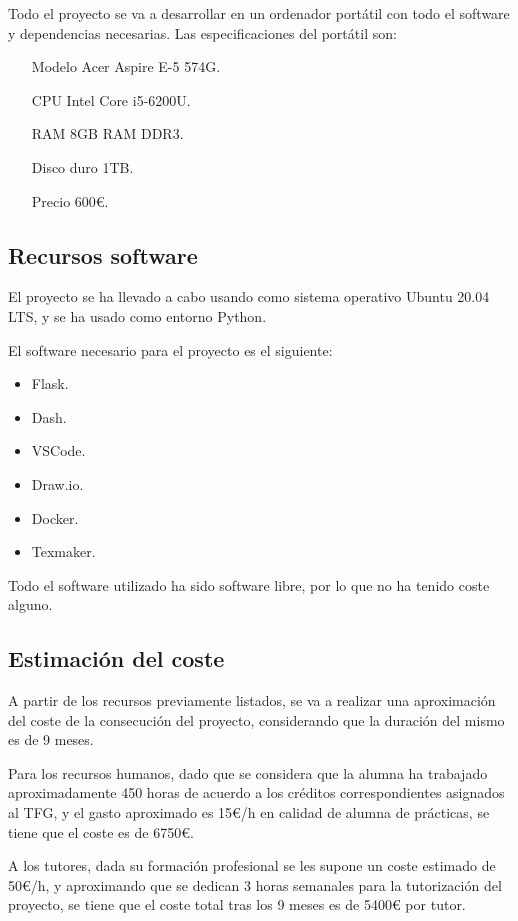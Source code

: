 Todo el proyecto se va a desarrollar en un ordenador portátil con todo el software y dependencias necesarias. Las especificaciones del portátil son:

\begin{itemize}
\item[Modelo] Acer Aspire E-5 574G.
\item[CPU] Intel Core i5-6200U.
\item[RAM] 8GB RAM DDR3.
\item[Disco duro] 1TB.
\item[Precio] 600€.
\end{itemize}

\subsection{Recursos software}

El proyecto se ha llevado a cabo usando como sistema operativo Ubuntu 20.04 LTS, y se ha usado como entorno Python.

El software necesario para el proyecto es el siguiente:

\begin{itemize}
\item Flask.
\item Dash.
\item VSCode.
\item Draw.io.
\item Docker.
\item Texmaker.
\end{itemize}

Todo el software utilizado ha sido software libre, por lo que no ha tenido coste alguno.

\subsection{Estimación del coste}

A partir de los recursos previamente listados, se va a realizar una aproximación del coste de la consecución del proyecto, considerando que la duración del mismo es de 9 meses.

Para los recursos humanos, dado que se considera que la alumna ha trabajado aproximadamente 450 horas de acuerdo a los créditos correspondientes asignados al TFG, y el gasto aproximado es 15€/h en calidad de alumna de prácticas, se tiene que el coste es de 6750€.

A los tutores, dada su formación profesional se les supone un coste estimado de 50€/h, y aproximando que se dedican 3 horas semanales para la tutorización del proyecto, se tiene que el coste total tras los 9 meses es de 5400€ por tutor.

